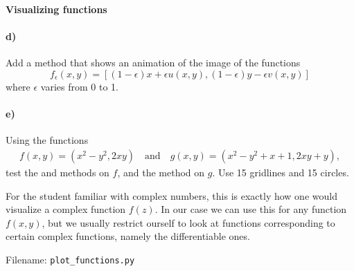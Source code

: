 \begin{Problem}{\textbf{Visualizing functions}}
\paragraph{d)}
Add a method  that shows an animation of the image of the
functions
\begin{equation*}
    f_\epsilon(x,y)=[(1-\epsilon) x + \epsilon u(x,y), (1-\epsilon)y-\epsilon v(x,y) ]
\end{equation*}
where $\epsilon$ varies from 0 to 1.

\paragraph{e)}
Using the functions
\begin{align*}
    f(x,y)=(x^2-y^2, 2xy) \quad \text{and} \quad g(x,y)=(x^2-y^2+x+1,2xy+y),
\end{align*}
test the  and  methods on $f$, and the  method on $g$. Use 15 gridlines
and 15 circles.
\begin{remark}
For the student familiar with complex numbers, this is exactly how one would
visualize a complex function $f(z)$. In our case we can use this for any function
$f(x,y)$, but we usually restrict ourself to look at functions corresponding to
certain complex functions, namely the differentiable ones.
\end{remark}

Filename: \texttt{plot\_functions.py}
\end{Problem}


